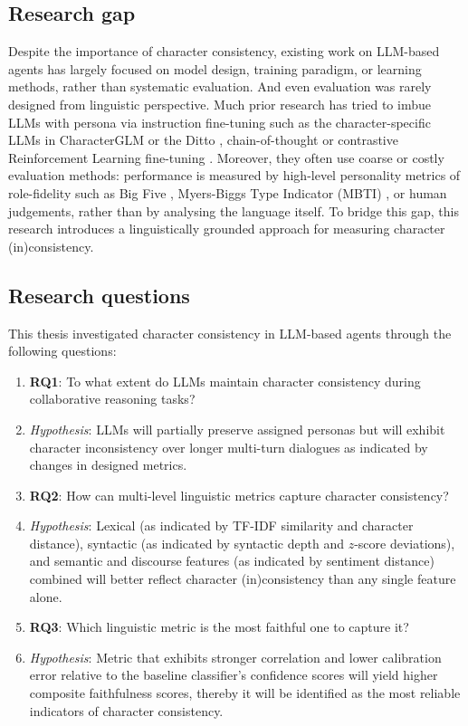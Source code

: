 \documentclass{article}
\begin{document}
\subsection{Research gap} \label{sec:intro_research_gap}

Despite the importance of character consistency, existing work on LLM-based agents has largely focused on model design, training paradigm, or learning methods, rather than systematic evaluation. And even evaluation was rarely designed from linguistic perspective. Much prior research has tried to imbue LLMs with persona via instruction fine-tuning such as the character-specific LLMs in CharacterGLM \citep{zhou2023characterglm} or the Ditto \citep{li2021ditto, lu2024large}, chain-of-thought \citep{chae2023dialogue}  or contrastive Reinforcement Learning fine-tuning \citep{shea2023building}. Moreover, they often use coarse or costly evaluation methods: performance is measured by high-level personality metrics of role-fidelity such as Big Five \citep{john1991bigfive}, Myers-Biggs Type Indicator (MBTI) \citep{myers1962mbti}, or human judgements, rather than by analysing the language itself. To bridge this gap, this research introduces a linguistically grounded approach for measuring character (in)consistency.


\subsection{Research questions} \label{sec:intro_rq}

This thesis investigated character consistency in LLM-based agents through the following questions:
\begin{enumerate}
    \item \textbf{RQ1}: To what extent do LLMs maintain character consistency during collaborative reasoning tasks?
    \item[] \textit{Hypothesis}: LLMs will partially preserve assigned personas but will exhibit character inconsistency over longer multi-turn dialogues as indicated by changes in designed metrics.
    \item \textbf{RQ2}: How can multi-level linguistic metrics capture character consistency?
    \item[] \textit{Hypothesis}: Lexical (as indicated by TF-IDF similarity and character distance), syntactic (as indicated by syntactic depth and $z$-score deviations), and semantic and discourse features (as indicated by sentiment distance) combined will better reflect character (in)consistency than any single feature alone.
    \item \textbf{RQ3}: Which linguistic metric is the most faithful one to capture it?
    \item[] \textit{Hypothesis}: Metric that exhibits stronger correlation and lower calibration error relative to the baseline classifier's confidence scores will yield higher composite faithfulness scores, thereby it will be identified as the most reliable indicators of character consistency.
\end{enumerate}
\end{document}
